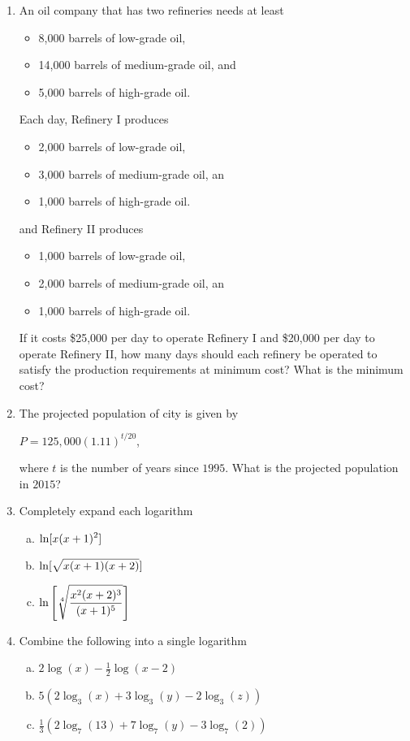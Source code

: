 \documentclass[11pt]{exam}
\begin{document}
\begin{enumerate}
\item An oil company that has two refineries needs at least 
\begin{itemize}
\item 8,000 barrels of low-grade oil,
\item 14,000 barrels of medium-grade oil, and 
\item 5,000 barrels of high-grade oil.
\end{itemize}
Each day, Refinery I produces
\begin{itemize}
\item 2,000 barrels of low-grade oil,
\item 3,000 barrels of medium-grade oil, an
\item 1,000 barrels of high-grade oil.
\end{itemize}
and Refinery II produces
\begin{itemize}
\item 1,000 barrels of low-grade oil,
\item 2,000 barrels of medium-grade oil, an
\item 1,000 barrels of high-grade oil.
\end{itemize}
If it costs \$25,000 per day to operate Refinery I and \$20,000 per day to operate Refinery II, how many days should each refinery be operated to satisfy the production requirements at minimum cost?  What is the minimum cost?

\item The projected population of city is given by
\begin{center}
$P = 125,000(1.11)^{t/20}$,
\end{center}
where $t$ is the number of years since $1995$.  What is the projected population in $2015$?


\item Completely expand each logarithm
\begin{multicols}{3}
\begin{enumerate}[(a)]
\item $\displaystyle{\ln[x(x+1)^2]}$
\columnbreak
\item $\displaystyle{\ln[\sqrt{x(x+1)(x+2)}]}$
\item $\displaystyle{\ln\left[\sqrt[4]{\frac{x^2(x+2)^3}{(x+1)^5}}\right]}$
\end{enumerate}
\end{multicols}
\newpage

\item Combine the following into a single logarithm
\begin{enumerate}[(a)]
\item $2\log(x) - \frac{1}{2}\log(x-2)$
\item $5(2\log_{3}(x) + 3\log_{3}(y) - 2\log_{3}(z))$
\item $\frac{1}{3}(2\log_{7}(13) + 7\log_{7}(y) - 3\log_{7}(2))$
\end{enumerate}


\end{enumerate}
\end{document}

